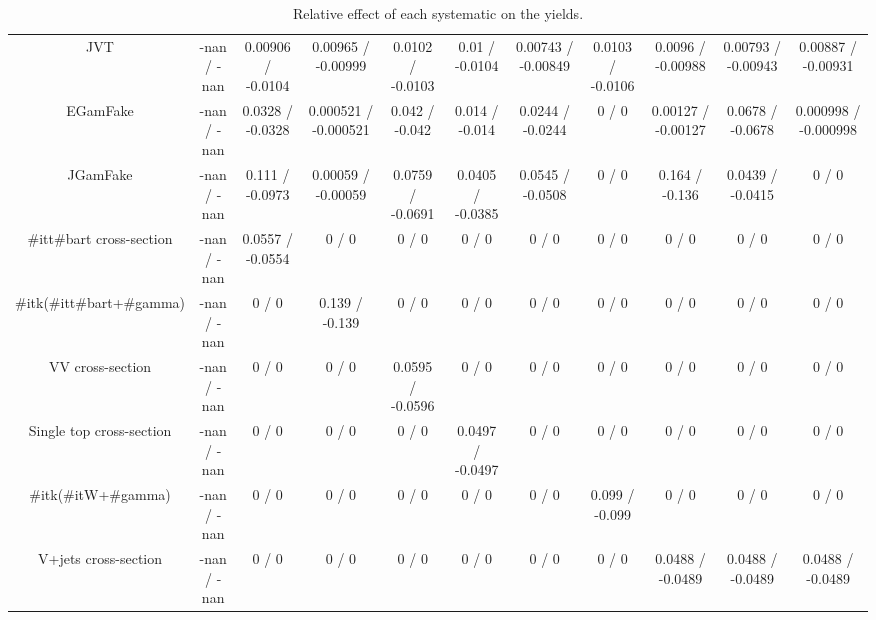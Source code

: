 \begin{table}[htbp]
\begin{center}
\begin{tabular}{|c|c|c|c|c|c|c|c|c|c|c|}
  JVT & -nan / -nan & 0.00906 / -0.0104 & 0.00965 / -0.00999 & 0.0102 / -0.0103 & 0.01 / -0.0104 & 0.00743 / -0.00849 & 0.0103 / -0.0106 & 0.0096 / -0.00988 & 0.00793 / -0.00943 & 0.00887 / -0.00931 \\ 
  EGamFake & -nan / -nan & 0.0328 / -0.0328 & 0.000521 / -0.000521 & 0.042 / -0.042 & 0.014 / -0.014 & 0.0244 / -0.0244 & 0 / 0 & 0.00127 / -0.00127 & 0.0678 / -0.0678 & 0.000998 / -0.000998 \\ 
  JGamFake & -nan / -nan & 0.111 / -0.0973 & 0.00059 / -0.00059 & 0.0759 / -0.0691 & 0.0405 / -0.0385 & 0.0545 / -0.0508 & 0 / 0 & 0.164 / -0.136 & 0.0439 / -0.0415 & 0 / 0 \\ 
  #it{t#bar{t}} cross-section & -nan / -nan & 0.0557 / -0.0554 & 0 / 0 & 0 / 0 & 0 / 0 & 0 / 0 & 0 / 0 & 0 / 0 & 0 / 0 & 0 / 0 \\ 
  #it{k}(#it{t#bar{t}+#gamma}) & -nan / -nan & 0 / 0 & 0.139 / -0.139 & 0 / 0 & 0 / 0 & 0 / 0 & 0 / 0 & 0 / 0 & 0 / 0 & 0 / 0 \\ 
  VV cross-section & -nan / -nan & 0 / 0 & 0 / 0 & 0.0595 / -0.0596 & 0 / 0 & 0 / 0 & 0 / 0 & 0 / 0 & 0 / 0 & 0 / 0 \\ 
  Single top cross-section & -nan / -nan & 0 / 0 & 0 / 0 & 0 / 0 & 0.0497 / -0.0497 & 0 / 0 & 0 / 0 & 0 / 0 & 0 / 0 & 0 / 0 \\ 
  #it{k}(#it{W+#gamma}) & -nan / -nan & 0 / 0 & 0 / 0 & 0 / 0 & 0 / 0 & 0 / 0 & 0.099 / -0.099 & 0 / 0 & 0 / 0 & 0 / 0 \\ 
  V+jets cross-section & -nan / -nan & 0 / 0 & 0 / 0 & 0 / 0 & 0 / 0 & 0 / 0 & 0 / 0 & 0.0488 / -0.0489 & 0.0488 / -0.0489 & 0.0488 / -0.0489 \\ 
\hline 
\end{tabular} 
\caption{Relative effect of each systematic on the yields.} 
\end{center} 
\end{table} 
